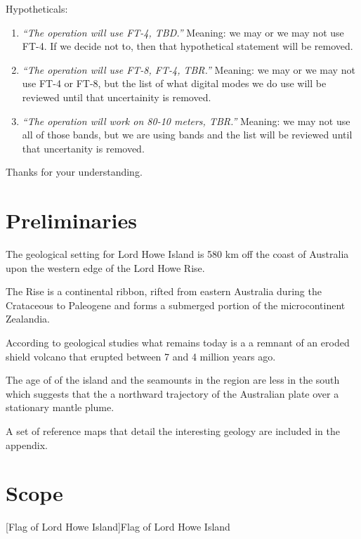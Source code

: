 \documentclass[11pt]{article}
\begin{document}
Hypotheticals:
\par
\begin{enumerate}
\item {\textit{``The operation will use FT-4, TBD.''}}   Meaning: we may or we may not use FT-4.  If we decide not to, then that hypothetical statement will be removed.
\item {\textit{``The operation will use FT-8, FT-4, TBR.''}}   Meaning: we may or we may not use FT-4 or FT-8, but the list of what digital modes we do use
will be reviewed until that uncertainity is removed.
\item {\textit{``The operation will work on 80-10 meters, TBR.''}}  Meaning: we may not use all of those bands, but we are using bands and the list will be reviewed until that uncertanity is removed.
\end{enumerate}
\par
Thanks for your understanding.

\newpage
\section{Preliminaries}

The geological setting for Lord Howe Island is 580 km off the coast
of Australia upon the western edge of the Lord Howe Rise.

\par
The Rise is a continental ribbon, rifted from eastern 
Australia during the Crataceous to Paleogene and
forms a submerged portion of the microcontinent
Zealandia.\cite{lhi}
\par
According to geological studies what remains today is a 
a remnant of an eroded shield volcano that 
erupted between 7 and 4 million years ago. 
\par
The age of of the island and the seamounts in the region are less in the
south which suggests that the a northward trajectory of the Australian plate
over a stationary mantle plume.
\par

A set of reference maps that detail the interesting geology are included
in the appendix.


\section{Scope}

\vskip2mm
\noindent%
\begin{minipage}{\linewidth}%
\captionsetup{width=0.8\linewidth}
[Flag of Lord Howe Island]{Flag of Lord Howe Island}
\label{flag}
\end{minipage}
\vskip5mm
\end{document}
